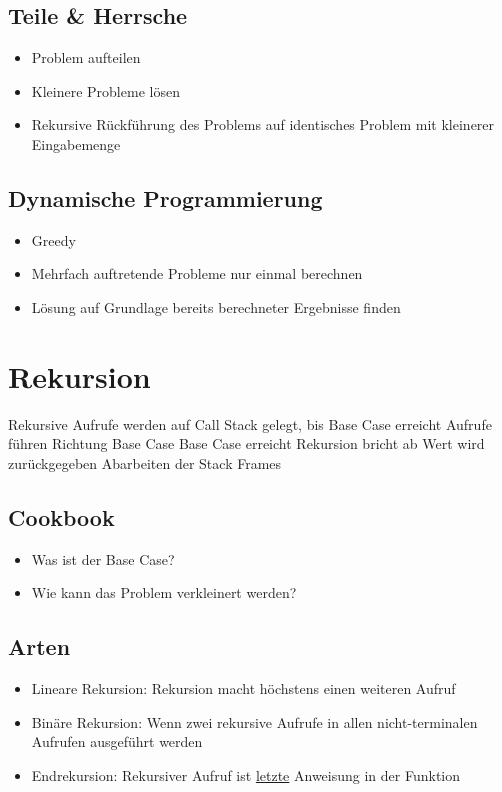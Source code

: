 \begin{multicols*}{4}
	\subsection{Teile \& Herrsche}
		\begin{itemize}
			\item Problem aufteilen
			\item Kleinere Probleme lösen
			\item Rekursive Rückführung des Problems auf identisches Problem mit kleinerer Eingabemenge
		\end{itemize}
	
	\subsection{Dynamische Programmierung}
		\begin{itemize}
			\item Greedy
			\item Mehrfach auftretende Probleme nur einmal berechnen
			\item Lösung auf Grundlage bereits berechneter Ergebnisse finden
		\end{itemize}

\section{Rekursion}
	\begin{outline}
		\1 Rekursive Aufrufe werden auf Call Stack gelegt, bis Base Case erreicht
		\2 Aufrufe führen Richtung Base Case
		\1 Base Case erreicht
		\2 Rekursion bricht ab
		\2 Wert wird zurückgegeben
		\2 Abarbeiten der Stack Frames
	\end{outline}

	\subsection{Cookbook}
		\begin{itemize}
			\item Was ist der Base Case?
			\item Wie kann das Problem verkleinert werden?
		\end{itemize}
	
	\subsection{Arten}
		\begin{itemize}
			\item Lineare Rekursion: Rekursion macht höchstens einen weiteren Aufruf
			\item Binäre Rekursion: Wenn zwei rekursive Aufrufe in allen nicht-terminalen Aufrufen ausgeführt werden
			\item Endrekursion: Rekursiver Aufruf ist \underline{letzte} Anweisung in der Funktion
		\end{itemize}


\end{multicols*}
